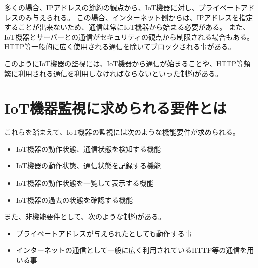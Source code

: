 多くの場合、IPアドレスの節約の観点から、IoT機器に対し、プライベートアドレスのみ与えられる。
この場合、インターネット側からは、IPアドレスを指定することが出来ないため、通信は常にIoT機器から始まる必要がある。
また、IoT機器とサーバーとの通信がセキュリティの観点から制限される場合もある。
HTTP等一般的に広く使用される通信を除いてブロックされる事がある。
\medskip

このようにIoT機器の監視には、IoT機器から通信が始まることや、HTTP等頻繁に利用される通信を利用しなければならないといった制約がある。


\section{IoT機器監視に求められる要件とは}%
これらを踏まえて、IoT機器の監視には次のような機能要件が求められる。
\begin{itemize}
	\item IoT機器の動作状態、通信状態を検知する機能
	\item IoT機器の動作状態、通信状態を記録する機能
	\item IoT機器の動作状態を一覧して表示する機能
	\item IoT機器の過去の状態を確認する機能
\end{itemize}
また、非機能要件として、次のような制約がある。
\begin{itemize}
	\item プライベートアドレスが与えられたとしても動作する事
	\item インターネットの通信として一般に広く利用されているHTTP等の通信を用いる事
\end{itemize}

